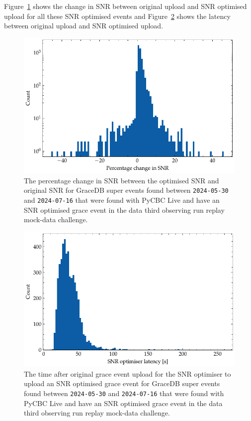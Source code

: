 Figure~\ref{7:fig:snr-diffs} shows the change in SNR between original upload and SNR optimised upload for all these SNR optimised events and Figure~\ref{7:fig:latencies} shows the latency between original upload and SNR optimised upload.
%
\begin{figure}
    \centering
    \includegraphics[width=1.0\linewidth]{images/7_snr_optimiser/snr_diffs.pdf}
    \caption{The percentage change in SNR between the optimised SNR and original SNR for GraceDB super events found between \texttt{2024-05-30} and \texttt{2024-07-16} that were found with PyCBC Live and have an SNR optimised grace event in the \gwadj data third observing run replay mock-data challenge.}
    \label{7:fig:snr-diffs}
\end{figure}
%
\begin{figure}
    \centering
    \includegraphics[width=1.0\linewidth]{images/7_snr_optimiser/latencies.pdf}
    \caption{The time after original grace event upload for the SNR optimiser to upload an SNR optimised grace event for GraceDB super events found between \texttt{2024-05-30} and \texttt{2024-07-16} that were found with PyCBC Live and have an SNR optimised grace event in the \gwadj data third observing run replay mock-data challenge.}
    \label{7:fig:latencies}
\end{figure}
